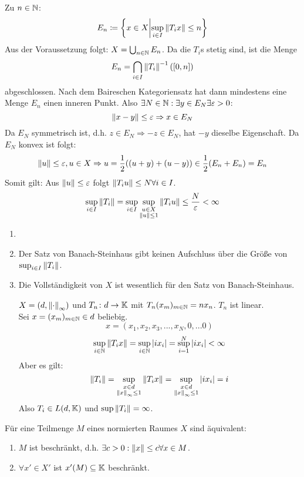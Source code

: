 \begin{beweis}
	Zu $ n\in\mathbb{N} $:
	\[ E_n\coloneqq\left\lbrace x\in X\middle|\sup_{i\in I}\left\|T_ix\right\|\leq n\right\rbrace \]
	Aus der Voraussetzung folgt: $ X=\bigcup_{n\in\mathbb{N}}E_n $. Da die $ T_i $s stetig sind, ist die Menge \[ E_n=\bigcap_{i\in I}\left\|T_i\right\|^{-1}([0,n]) \] abgeschlossen. Nach dem Baireschen Kategoriensatz hat dann mindestens eine Menge $ E_n $ einen inneren Punkt. Also $ \exists N\in\mathbb{N}: \exists y\in E_N\exists\varepsilon>0 $:
	\[ \left\|x-y\right\|\leq\varepsilon\Rightarrow x\in E_N \]
	Da $ E_N $ symmetrisch ist, d.h. $ z\in E_N\Rightarrow -z\in E_N $, hat $ -y $ dieselbe Eigenschaft. Da $ E_N $ konvex ist folgt:
	\[ \left\|u\right\|\leq\varepsilon,u\in X\Rightarrow u=\frac{1}{2}((u+y)+(u-y))\in\frac{1}{2}(E_n+E_n)=E_n \]
	Somit gilt: Aus $ \left\|u\right\|\leq\varepsilon $ folgt $ \left\|T_i u\right\|\leq N\forall i\in I $.
	\[ \sup_{i\in I}\left\|T_i\right\|=\sup_{i\in I}\sup_{\substack{u\in X\\\left\|u\right\|\leq 1}}\left\|T_iu\right\|\leq\frac{N}{\varepsilon}<\infty \]
\end{beweis}
\begin{bemerkung*}
	\begin{enumerate}
		\item[]
		\item Der Satz von Banach-Steinhaus gibt keinen Aufschluss \"uber die Gr\"o\ss e von $ \sup_{i\in I}\left\|T_i\right\| $.
		\item Die Vollst\"andigkeit von $ X $ ist wesentlich f\"ur den Satz von Banach-Steinhaus.
		\begin{beispiel*}
			$ X=(d,\left\|\cdot\right\|_\infty) $ und $ T_n\colon d\rightarrow\mathbb{K} $ mit $ T_n(x_m)_{m\in\mathbb{N}}=nx_n $. $ T_n $ ist linear.\\
			Sei $ x=(x_m)_{m\in\mathbb{N}}\in d $ beliebig.
			\[ x=(x_1,x_2,x_3,...,x_N,0,...0) \]
			\[ \sup_{i\in\mathbb{N}}\left\|T_ix\right\|=\sup_{i\in\mathbb{N}}|ix_i|=\sup_{i=1}^N|ix_i|<\infty \] 
			Aber es gilt:
			\[ \left\|T_i\right\|=\sup_{\substack{x\in d\\\left\|x\right\|_\infty\leq 1}}\left\|T_ix\right\|=\sup_{\substack{x\in d\\\left\|x\right\|_{\infty}\leq 1}}|ix_i|=i \]
			Also $ T_i\in L(d,\mathbb{K}) $ und $ \sup\left\|T_i\right\|=\infty $.
		\end{beispiel*}
	\end{enumerate}
\end{bemerkung*}
\begin{korollar}
	F\"ur eine Teilmenge $ M $ eines normierten Raumes $ X $ sind \"aquivalent:
	\begin{enumerate}
		\item $ M $ ist beschr\"ankt, d.h. $ \exists c>0:\left\|x\right\|\leq c\forall x\in M $.
		\item $ \forall x'\in X' $ ist $ x'(M)\subseteq\mathbb{K} $ beschr\"ankt.
	\end{enumerate}
\end{korollar}
